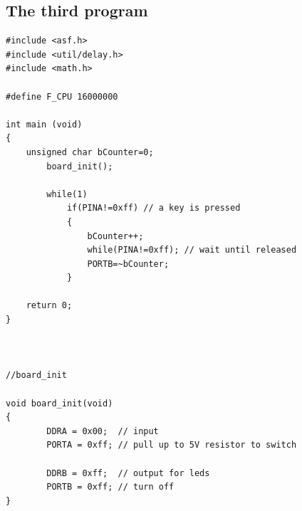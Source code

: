\documentclass[english]{article}
\begin{document}
\subsection{The third program}
\begin{lstlisting}
#include <asf.h>
#include <util/delay.h>
#include <math.h>

#define F_CPU 16000000

int main (void)
{
	unsigned char bCounter=0;
		board_init();
			
		while(1)
			if(PINA!=0xff) // a key is pressed
			{
				bCounter++;
				while(PINA!=0xff); // wait until released
				PORTB=~bCounter;
			}
	   	   
	return 0;
}



//board_init

void board_init(void)
{
		DDRA = 0x00;  // input
		PORTA = 0xff; // pull up to 5V resistor to switch

		DDRB = 0xff;  // output for leds
		PORTB = 0xff; // turn off
}
\end{lstlisting}
\end{document}
